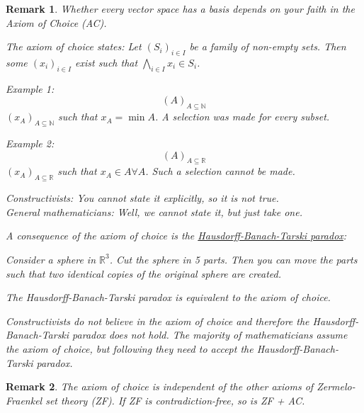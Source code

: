 \documentclass[a4paper,landscape,twocolumn]{article}
\newtheorem{rem}{Remark}
\begin{document}
\begin{rem}
  Whether every vector space has a basis depends on your faith in the Axiom of Choice (AC).

  The axiom of choice states: Let $(S_i)_{i \in I}$ be a family of non-empty sets.
  Then some $(x_i)_{i \in I}$ exist such that $\bigwedge_{i \in I} x_i \in S_i$.

  Example 1:
  \[ (A)_{A \subseteq \mathbb N} \]
  $(x_A)_{A \subseteq \mathbb N}$ such that $x_A = \min{A}$.
  A selection was made for every subset.

  Example 2:
  \[ (A)_{A \subseteq \mathbb R} \]
  $(x_A)_{A \subseteq \mathbb R}$ such that $x_A \in A \forall A$.
  Such a selection cannot be made.

  Constructivists: You cannot state it explicitly, so it is not true. \\
  General mathematicians: Well, we cannot state it, but just take one.

  A consequence of the axiom of choice is the \href{https://en.wikipedia.org/wiki/Banach%E2%80%93Tarski_paradox}{Hausdorff-Banach-Tarski paradox}:

  Consider a sphere in $\mathbb R^3$.
  Cut the sphere in 5 parts.
  Then you can move the parts such that two identical copies of the original sphere are created.

  The Hausdorff-Banach-Tarski paradox is equivalent to the axiom of choice.

  Constructivists do not believe in the axiom of choice and therefore the Hausdorff-Banach-Tarski paradox does not hold.
  The majority of mathematicians assume the axiom of choice, but following they need to accept the Hausdorff-Banach-Tarski paradox.
\end{rem}

\begin{rem}
  The axiom of choice is independent of the other axioms of Zermelo-Fraenkel set theory (ZF).
  If ZF is contradiction-free, so is ZF + AC.
\end{rem}
\end{document}
